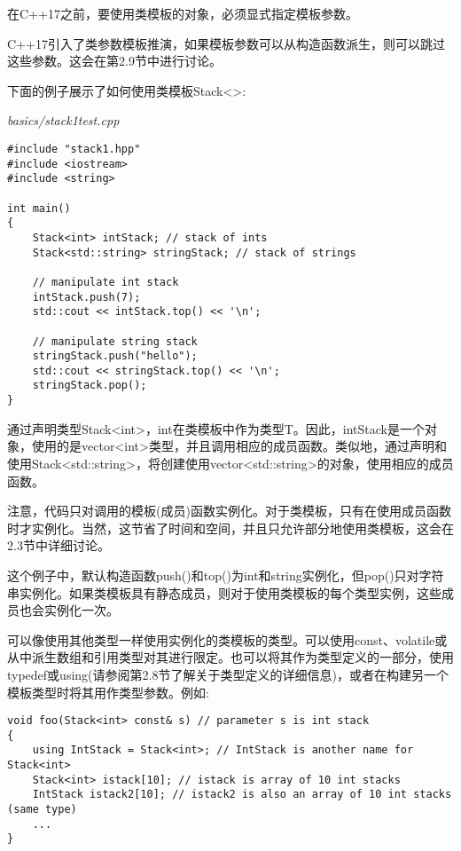 在C++17之前，要使用类模板的对象，必须显式指定模板参数。

\begin{tcolorbox}[colback=webgreen!5!white,colframe=webgreen!75!black]
\hspace*{0.75cm}C++17引入了类参数模板推演，如果模板参数可以从构造函数派生，则可以跳过这些参数。这会在第2.9节中进行讨论。
\end{tcolorbox}

下面的例子展示了如何使用类模板Stack<>:

\noindent
\textit{basics/stack1test.cpp}
\begin{lstlisting}[style=styleCXX]
#include "stack1.hpp"
#include <iostream>
#include <string>

int main()
{
	Stack<int> intStack; // stack of ints
	Stack<std::string> stringStack; // stack of strings
	
	// manipulate int stack
	intStack.push(7);
	std::cout << intStack.top() << '\n';
	
	// manipulate string stack
	stringStack.push("hello");
	std::cout << stringStack.top() << '\n';
	stringStack.pop();
}
\end{lstlisting}

通过声明类型Stack<int>，int在类模板中作为类型T。因此，intStack是一个对象，使用的是vector<int>类型，并且调用相应的成员函数。类似地，通过声明和使用Stack<std::string>，将创建使用vector<std::string>的对象，使用相应的成员函数。

注意，代码只对调用的模板(成员)函数实例化。对于类模板，只有在使用成员函数时才实例化。当然，这节省了时间和空间，并且只允许部分地使用类模板，这会在2.3节中详细讨论。

这个例子中，默认构造函数push()和top()为int和string实例化，但pop()只对字符串实例化。如果类模板具有静态成员，则对于使用类模板的每个类型实例，这些成员也会实例化一次。

可以像使用其他类型一样使用实例化的类模板的类型。可以使用const、volatile或从中派生数组和引用类型对其进行限定。也可以将其作为类型定义的一部分，使用typedef或using(请参阅第2.8节了解关于类型定义的详细信息)，或者在构建另一个模板类型时将其用作类型参数。例如:

\begin{lstlisting}[style=styleCXX]
void foo(Stack<int> const& s) // parameter s is int stack
{
	using IntStack = Stack<int>; // IntStack is another name for Stack<int>
	Stack<int> istack[10]; // istack is array of 10 int stacks
	IntStack istack2[10]; // istack2 is also an array of 10 int stacks (same type)
	...
}
\end{lstlisting}

